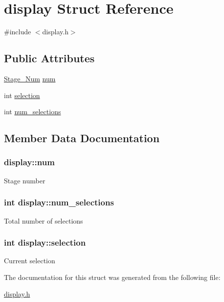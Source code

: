 \hypertarget{structdisplay}{\section{display Struct Reference}
\label{structdisplay}
}


{\ttfamily \#include $<$display.\+h$>$}

\subsection*{Public Attributes}
\begin{DoxyCompactItemize}
\item 
\hyperlink{display_8h_a3e669e78aeefe7165ede3f6e91e639b2}{Stage\+\_\+\+Num} \hyperlink{structdisplay_a98085f9ee9540714ab2cc210334adf22}{num}
\item 
int \hyperlink{structdisplay_a9d60036308f837e2a643f866150b680f}{selection}
\item 
int \hyperlink{structdisplay_a344b6c61a47377cb86840cae1f5707bf}{num\+\_\+selections}
\end{DoxyCompactItemize}


\subsection{Member Data Documentation}
\hypertarget{structdisplay_a98085f9ee9540714ab2cc210334adf22}{
\subsubsection[{num}]{ display\+::num}}\label{structdisplay_a98085f9ee9540714ab2cc210334adf22}
Stage number \hypertarget{structdisplay_a344b6c61a47377cb86840cae1f5707bf}{
\subsubsection[{num\+\_\+selections}]{\setlength{\rightskip}{0pt plus 5cm}int display\+::num\+\_\+selections}}\label{structdisplay_a344b6c61a47377cb86840cae1f5707bf}
Total number of selections \hypertarget{structdisplay_a9d60036308f837e2a643f866150b680f}{
\subsubsection[{selection}]{\setlength{\rightskip}{0pt plus 5cm}int display\+::selection}}\label{structdisplay_a9d60036308f837e2a643f866150b680f}
Current selection 

The documentation for this struct was generated from the following file\+:\begin{DoxyCompactItemize}
\item 
\hyperlink{display_8h}{display.\+h}\end{DoxyCompactItemize}
